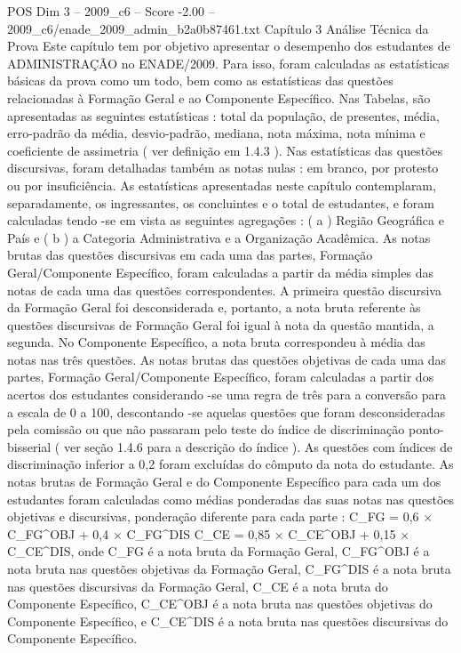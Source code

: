 \begin{textsample}{POS Dim 3 – 2009\_c6 – Score -2.00 – 2009\_c6/enade\_2009\_admin\_b2a0b87461.txt}  \label{ex:f3_pos_236}
Capítulo 3 Análise Técnica da Prova Este capítulo tem por objetivo apresentar o desempenho dos estudantes de ADMINISTRAÇÃO no ENADE/2009.
Para isso, foram calculadas as estatísticas básicas da prova como um todo, bem como as estatísticas das questões relacionadas à Formação Geral e ao Componente Específico.
Nas Tabelas, são apresentadas as seguintes estatísticas : total da população, de presentes, média, erro-padrão da média, desvio-padrão, mediana, nota máxima, nota mínima e coeficiente de assimetria ( ver definição em 1.4.3 ).
Nas estatísticas das questões discursivas, foram detalhadas também as notas nulas : em branco, por protesto ou por insuficiência.
As estatísticas apresentadas neste capítulo contemplaram, separadamente, os ingressantes, os concluintes e o total de estudantes, e foram calculadas tendo -se em vista as seguintes agregações : ( a ) Região Geográfica e País e ( b ) a Categoria Administrativa e a Organização Acadêmica.
As notas brutas das questões discursivas em cada uma das partes, Formação Geral/Componente Específico, foram calculadas a partir da média simples das notas de cada uma das questões correspondentes.
A primeira questão discursiva da Formação Geral foi desconsiderada e, portanto, a nota bruta referente às questões discursivas de Formação Geral foi igual à nota da questão mantida, a segunda.
No Componente Específico, a nota bruta correspondeu à média das notas nas três questões.
As notas brutas das questões objetivas de cada uma das partes, Formação Geral/Componente Específico, foram calculadas a partir dos acertos dos estudantes considerando -se uma regra de três para a conversão para a escala de 0 a 100, descontando -se aquelas questões que foram desconsideradas pela comissão ou que não passaram pelo teste do índice de discriminação ponto-bisserial ( ver seção 1.4.6 para a descrição do índice ).
As questões com índices de discriminação inferior a 0,2 foram excluídas do cômputo da nota do estudante.
As notas brutas de Formação Geral e do Componente Específico para cada um dos estudantes foram calculadas como médias ponderadas das suas notas nas questões objetivas e discursivas, ponderação diferente para cada parte : C\_FG = 0,6 × C\_FG\textasciicircum{}OBJ + 0,4 × C\_FG\textasciicircum{}DIS C\_CE = 0,85 × C\_CE\textasciicircum{}OBJ + 0,15 × C\_CE\textasciicircum{}DIS, onde C\_FG é a nota bruta da Formação Geral, C\_FG\textasciicircum{}OBJ é a nota bruta nas questões objetivas da Formação Geral, C\_FG\textasciicircum{}DIS é a nota bruta nas questões discursivas da Formação Geral, C\_CE é a nota bruta do Componente Específico, C\_CE\textasciicircum{}OBJ é a nota bruta nas questões objetivas do Componente Específico, e C\_CE\textasciicircum{}DIS é a nota bruta nas questões discursivas do Componente Específico.

\end{textsample}
